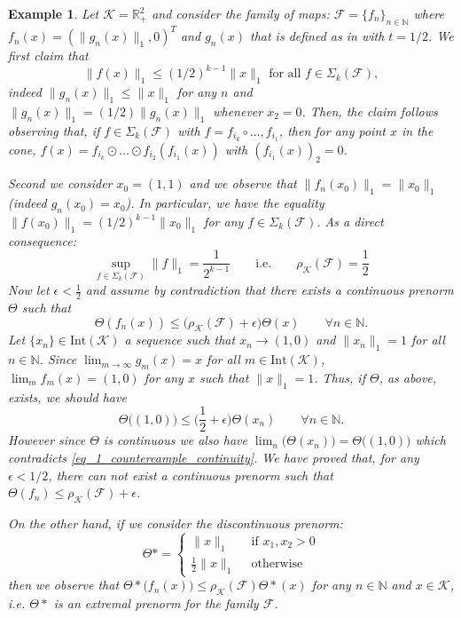 \documentclass{article}
\newtheorem{example}[theorem]{Example}
\newcommand{\R}{\mathbb{R}}
\newcommand{\N}{\mathbb{N}}
\newcommand{\family}{\mathcal{F}}
\newcommand{\cradius}{\rho_{\cone}}
\newcommand{\cone}{\mathcal{K}}
\newcommand{\interior}{\mathrm{Int}}
\begin{document}
\begin{example}
Let $\cone=\R^2_+$ and consider the family of maps:
$\family=\{f_n\}_{n\in \N}$ where $f_n(x)=(\|g_n(x)\|_1,0)^T$ and $g_n(x)$ that is defined as in  with $t=1/2$. 
%
We first claim that 
%
\begin{equation}
    \|f(x)\|_1\leq (1/2)^{k-1}\|x\|_1  \text{ for all } f\in \Sigma_k(\family),
\end{equation} 
%
indeed $\|g_n(x)\|_1\leq \|x\|_1$ for any $n$ and $\|g_n(x)\|_1=(1/2)\|g_n(x)\|_1$ whenever $x_2=0$.
%
Then, the claim follows observing that, if $f\in \Sigma_k(\family)$ with $f=f_{i_k}\circ \dots, f_{i_1}$, then for any point $x$ in the cone, $f(x)=f_{i_k} \odot \dots \odot f_{i_{2}}(f_{i_1}(x))$ with $(f_{i_1}(x))_2=0$. 
%

%
Second we consider $x_0=(1,1)$ and we observe that $\|f_n(x_0)\|_1=\|x_0\|_1$ (indeed $g_n(x_0)=x_0$). In particular, we have the equality $\|f(x_0)\|_1=(1/2)^{k-1}\|x_0\|_1$ for any $f\in \Sigma_k(\family)$. 
%
As a direct consequence:
 \begin{equation}
    \sup_{f\in \Sigma_k(\family)}\|f\|_1=\frac{1}{2^{k-1}} \qquad \mathrm{i.e.} \qquad \cradius(\family)=\frac{1}{2}
\end{equation}
%
Now let $\epsilon<\frac{1}{2}$ and assume by contradiction that there exists a continuous prenorm $\Theta$ such that 
%
\begin{equation}
    \Theta(f_n(x))\leq \Big(\cradius(\family)+\epsilon\Big)\Theta(x) \qquad \forall n\in \N.
\end{equation}
%
Let $\{x_n\}\in \interior(\cone)$ a sequence such that $x_n\rightarrow (1,0)$ and $\|x_n\|_1=1$ for all $n\in \N$.
%
Since $\lim_{m\rightarrow \infty} g_m(x)=x$ for all $m \in \interior(\cone)$, $\lim_m f_m(x)=(1,0)$ for any $x$ such that $\|x\|_1=1$. Thus, if $\Theta$, as above, exists, we should have 
%
\begin{equation}\label{eq_1_countereample_continuity}
    \Theta\big((1,0)\big)\leq \Big(\frac{1}{2}+\epsilon\Big)\Theta(x_n) \qquad \forall n\in \N.
\end{equation}
%
However since $\Theta$ is continuous we also have $\lim_n\big(\Theta(x_n)\big)=\Theta\big((1,0)\big)$ which contradicts \eqref{eq_1_countereample_continuity}. 
%
We have proved that, for any $\epsilon<1/2$, there can not exist a continuous prenorm such that $\Theta(f_n)\leq \cradius(\family)+\epsilon$.

On the other hand, if we consider the discontinuous prenorm:
\begin{equation}
    \Theta*=\begin{cases}
        \|x\|_1 \quad &\text{if } x_1,x_2>0\\
        \displaystyle{\frac 1 2}\|x\|_1 &\text{otherwise} 
    \end{cases}
\end{equation}
then we observe that $\Theta*\big(f_n(x)\big)\leq \cradius(\family)\Theta*(x)$ for any $n\in \N$ and $x\in \cone$, i.e. $\Theta*$ is an extremal prenorm for the family $\family$. 
\end{example}
\end{document}
